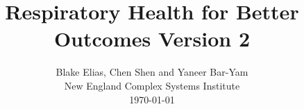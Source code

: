 \documentclass[onecolumn,journal]{IEEEtran}
\begin{document}
\title{\color{Brown} Respiratory Health for Better Outcomes Version 2 \\
\vspace{-0.35ex}}
\author{Blake Elias, Chen Shen and Yaneer Bar-Yam \\
New England Complex Systems Institute\\
 \today 
  \vspace{-12ex} \\ 

   
\bigskip

\textbf{}
 }
    
\maketitle


\flushbottom %



\thispagestyle{empty} %




\renewcommand{\thefootnote}{\fnsymbol{footnote}}
\end{document}
